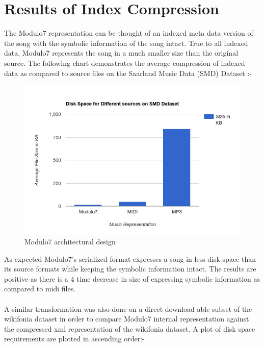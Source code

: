 \section{Results of Index Compression}

\noindent The Modulo7 representation can be thought of an indexed meta data version of the song with the symbolic information of the song intact. True to all indexed data, Modulo7 represents the song in a much smaller size than the original source. The following chart demonstrates the average compression of indexed data as compared to source files on the Saarland Music Data (SMD) Dataset \cite{saarlandmsd}:-
\begin{figure}
\centering
\includegraphics[width=\textwidth]{Modulo7SMDBarGraph.png}
\makeatletter
\let\@currsize\normalsize
\caption{Modulo7 architectural design}
\label{fig:figure}
\end{figure}
As expected Modulo7's serialized format expresses a song in less disk space than its source formats while keeping the symbolic information intact. The results are positive as there is a 4 time decrease in size of expressing symbolic information as compared to midi files. \\\\
A similar transformation was also done on a direct download able subset of the wikifonia dataset in order to compare Modulo7 internal representation against the compressed xml representation of the wikifonia dataset. A plot of disk space requirements are plotted in ascending order:- 
